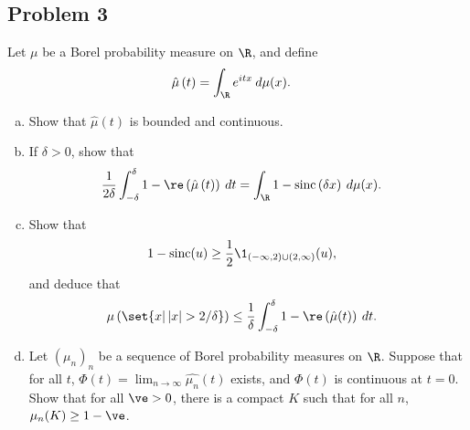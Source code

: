 \documentclass[10pt]{mypackage}
\DeclareMathOperator{\sinc}{sinc}
\begin{document}
\subsection{Problem 3}%
\begin{problem}
  Let $\mu$ be a Borel probability measure on $\R$, and define
  \begin{align*}
    \hat{\mu}\left( t \right) &= \int_{\R}^{} e^{itx}\:d\mu(x).
  \end{align*}
  \begin{enumerate}[(a)]
    \item Show that $\hat{\mu}(t)$ is bounded and continuous.
    \item If $\delta > 0$, show that
      \begin{align*}
        \frac{1}{2\delta} \int_{-\delta}^{\delta} 1-\re\left( \hat{\mu}\left( t \right) \right)\:dt &= \int_{\R}^{} 1-\sinc\left(\delta x\right)\:d\mu(x).
      \end{align*}
    \item Show that
      \begin{align*}
        1-\sinc(u) &\geq \frac{1}{2}\1_{\left( -\infty,2 \right)\cup \left( 2,\infty \right)}(u),
      \end{align*}
      and deduce that
      \begin{align*}
        \mu\left( \set{x | \left\vert x \right\vert > 2/\delta} \right) &\leq \frac{1}{\delta}\int_{-\delta}^{\delta} 1-\re\left( \hat{\mu}(t) \right)\:dt.
      \end{align*}
    \item Let $\left(\mu_n\right)_n$ be a sequence of Borel probability measures on $\R$. Suppose that for all $t$, $\Phi(t) = \lim_{n\rightarrow\infty}\widehat{\mu_n}(t)$ exists, and $\Phi(t)$ is continuous at $t=0$. Show that for all $\ve > 0$, there is a compact $K$ such that for all $n$, $\mu_n(K)\geq 1-\ve$.
  \end{enumerate}
\end{problem}
\end{document}

